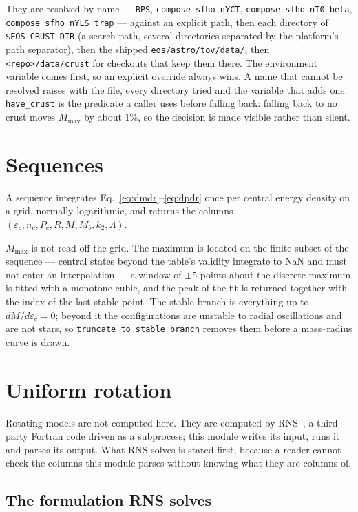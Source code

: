 \documentclass[aps,prc,onecolumn,superscriptaddress,nofootinbib,10pt]{revtex4-2}
\begin{document}
They are resolved by name
--- \texttt{BPS}, \texttt{compose\_sfho\_nYCT},
\texttt{compose\_sfho\_nT0\_beta}, \texttt{compose\_sfho\_nYLS\_trap} --- against
an explicit path, then each directory of \texttt{\$EOS\_CRUST\_DIR} (a search
path, several directories separated by the platform's path separator), then the
shipped \texttt{eos/astro/tov/data/}, then \texttt{<repo>/data/crust} for
checkouts that keep them there. The environment variable comes first, so an
explicit override always wins. A name that cannot be resolved raises with the
file, every directory tried and the variable that adds one. \texttt{have\_crust}
is the predicate a caller uses before falling back: falling back to no crust
moves $M_{\max}$ by about 1\%, so the decision is made visible rather than
silent.

\section{Sequences}
\label{sec:sequences}

A sequence integrates Eq.~\eqref{eq:dmdr}--\eqref{eq:dpdr} once per central
energy density on a grid, normally logarithmic, and returns the columns
$(\varepsilon_c, n_c, P_c, R, M, M_b, k_2, \Lambda)$.

$M_{\max}$ is not read off the grid. The maximum is located on the finite
subset of the sequence --- central states beyond the table's validity integrate
to NaN and must not enter an interpolation --- a window of $\pm 5$ points about
the discrete maximum is fitted with a monotone cubic, and the peak of the fit
is returned together with the index of the last stable point. The stable branch
is everything up to $dM/d\varepsilon_c = 0$; beyond it the configurations are
unstable to radial oscillations and are not stars, so
\texttt{truncate\_to\_stable\_branch} removes them before a mass--radius curve
is drawn.

\section{Uniform rotation}
\label{sec:rotating}

Rotating models are not computed here. They are computed by
RNS~\cite{StergioulasFriedman1995}, a third-party Fortran code driven as a
subprocess; this module writes its input, runs it and parses its output. What
RNS solves is stated first, because a reader cannot check the columns this
module parses without knowing what they are columns of.

\subsection{The formulation RNS solves}
\label{sec:rnsform}
\end{document}
